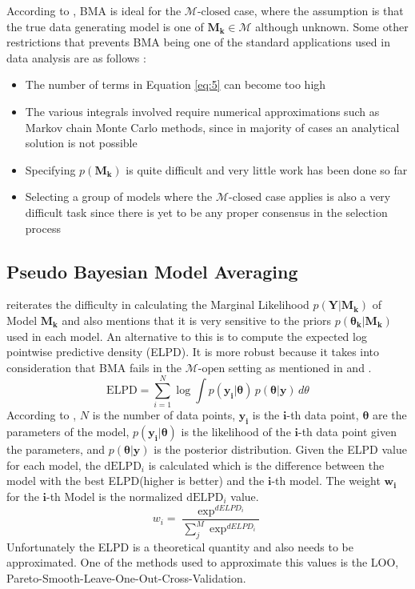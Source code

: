 \documentclass[12 pt]{scrartcl}
\begin{document}
	According to \citep[p. 918]{yao2018using}, BMA is ideal for the $\mathcal{M}\text{-closed}$ case, where the assumption is that the true data generating model is one of $\boldsymbol{M_k} \in \mathcal{M}$ although unknown. Some other restrictions that prevents BMA being one of the standard applications used in data analysis are as follows \cite[p. 384]{BMA-Hoeting}:
	\begin{itemize}
		\item The number of terms in Equation \ref{eq:5} can become too high
		\item The various integrals involved require numerical approximations such as Markov chain Monte Carlo methods, since in majority of cases an analytical solution is not possible
		\item Specifying $p(\boldsymbol{M_k})$ is quite difficult and very little work has been done so far
		\item Selecting a group of models where the $\mathcal{M}\text{-closed}$ case applies is also a very difficult task since there is yet to be any proper consensus in the selection process
	\end{itemize}
	
	\subsection{Pseudo Bayesian Model Averaging}
	\citep{yao2018using} reiterates the difficulty in calculating the Marginal Likelihood $p(\boldsymbol{Y|M_k})$ of Model $\boldsymbol{M_k}$ and also mentions that it is very sensitive to the priors $p(\boldsymbol{\theta_k|M_k})$ used in each model. An alternative to this is to compute the expected log pointwise predictive density (ELPD). It is more robust because it takes into consideration that BMA fails in the $\mathcal{M}\text{-open}$ setting as mentioned in \citep{martin2021model} and \citep{yao2018using}.
	\begin{equation}
		\text{ELPD} = \sum_{i=1}^{N} \log \int p(\boldsymbol{y_i|\theta}) \, p(\boldsymbol{\theta|y}) \, d\theta
		\label{eq:8}
	\end{equation}
	According to \citep{martin2021model}, $N$ is the number of data points, $\boldsymbol{y_i}$ is the $\boldsymbol{i}$-th data point, $\boldsymbol{\theta}$ are the parameters of the model, $p(\boldsymbol{y_i|\theta})$ is the likelihood of the $\boldsymbol{i}$-th data point given the parameters, and $p(\boldsymbol{\theta|y})$ is the posterior distribution. Given the ELPD value for each model, the $\text{dELPD}_i$ is calculated which is the difference between the model with the best ELPD(higher is better) and the $\boldsymbol{i}$-th model. The weight $\boldsymbol{w_i}$ for the $\boldsymbol{i}$-th Model is the normalized $\text{dELPD}_i$ value.
	\begin{equation}
		w_i = \frac{\exp^{dELPD_i}}{\sum_{j}^{M}\exp^{dELPD_i}}
		\label{eq:9}
	\end{equation}
	Unfortunately the ELPD is a theoretical quantity and also needs to be approximated. One of the methods used to approximate this values is the LOO, Pareto-Smooth-Leave-One-Out-Cross-Validation.
	
\end{document}
